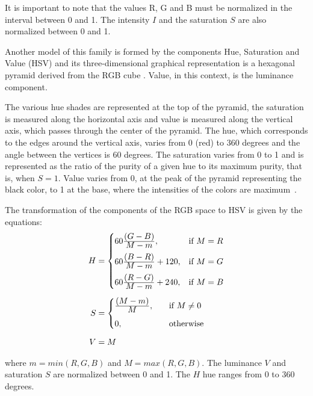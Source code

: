 It is important to note that the values R, G and B must be normalized in the interval between 0 and 1. The intensity $I$ and the saturation $S$ are also normalized between 0 and 1.

Another model of this family is formed by the components Hue, Saturation and Value (HSV) and its three-dimensional graphical representation is a hexagonal pyramid derived from the RGB cube \citep{pedrini:08}. Value, in this context, is the luminance component.

The various hue shades are represented at the top of the pyramid, the saturation is measured along the horizontal axis and value is measured along the vertical axis, which passes through the center of the pyramid. The hue, which corresponds to the edges around the vertical axis, varies from 0 (red) to 360 degrees and the angle between the vertices is 60 degrees. The saturation varies from 0 to 1 and is represented as the ratio of the purity of a given hue to its maximum purity, that is, when $S = 1$. Value varies from 0, at the peak of the pyramid representing the black color, to 1 at the base, where the intensities of the colors are maximum~\citep{pedrini:08}.

The transformation of the components of the RGB space to HSV is given by the equations:
\begin{align}
\label{eq:rgb_para_hsv}
\begin{split}
  H &=  \begin{cases}
            60\frac{\displaystyle (G - B)}{\displaystyle M - m}, & \text{if}\ M = R\\[0.7em]
            60\frac{\displaystyle (B - R)}{\displaystyle M - m} + 120, & \text{if}\ M = G\\[0.7em]
            60\frac{\displaystyle (R - G)}{\displaystyle M - m} + 240, & \text{if}\ M = B
       \end{cases}
  \\[0.5em]
  S &=  \begin{cases}
            \frac{\displaystyle (M - m)}{\displaystyle M}, \quad &\text{if}\ M \neq 0\\[0.7em]
            0, \quad &\text{otherwise}\\
       \end{cases}
  \\[0.5em]
  V &= M
\end{split}
\end{align}

\noindent where $m = min(R, G ,B)$ and $M = max(R, G ,B)$. The luminance $V$ and saturation $S$ are normalized between 0 and 1. The $H$ hue ranges from 0 to 360 degrees.

